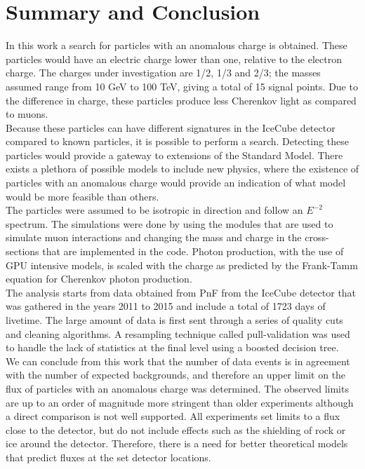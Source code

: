 \chapter{Summary and Conclusion}
\label{ch:summary}
In this work a search for particles with an anomalous charge is obtained. These particles would have an electric charge lower than one, relative to the electron charge. The charges under investigation are 1/2, 1/3 and 2/3; the masses assumed range from 10 GeV to 100 TeV, giving a total of 15 signal points. Due to the difference in charge, these particles produce less Cherenkov light as compared to muons.\\

\noindent Because these particles can have different signatures in the IceCube detector compared to known particles, it is possible to perform a search. Detecting these particles would provide a gateway to extensions of the Standard Model. There exists a plethora of possible models to include new physics, where the existence of particles with an anomalous charge would provide an indication of what model would be more feasible than others.\\

\noindent The particles were assumed to be isotropic in direction and follow an $E^{-2}$ spectrum. The simulations were done by using the modules that are used to simulate muon interactions and changing the mass and charge in the cross-sections that are implemented in the code. Photon production, with the use of GPU intensive models, is scaled with the charge as predicted by the Frank-Tamm equation for Cherenkov photon production.\\

\noindent The analysis starts from data obtained from PnF from the IceCube detector that was gathered in the years 2011 to 2015 and include a total of 1723 days of livetime. The large amount of data is first sent through a series of quality cuts and cleaning algorithms. A resampling technique called pull-validation was used to handle the lack of statistics at the final level using a boosted decision tree.\\

\noindent We can conclude from this work that the number of data events is in agreement with the number of expected backgrounds, and therefore an upper limit on the flux of particles with an anomalous charge was determined. The observed limits are up to an order of magnitude more stringent than older experiments although a direct comparison is not well supported. All experiments set limits to a flux close to the detector, but do not include effects such as the shielding of rock or ice around the detector. Therefore, there is a need for better theoretical models that predict fluxes at the set detector locations.\\

